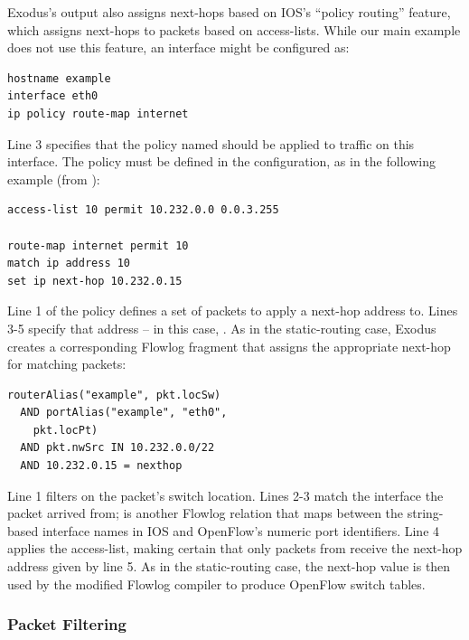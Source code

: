 Exodus's output also assigns next-hops based on IOS's ``policy
routing'' feature, which assigns next-hops to packets
based on access-lists. While our main example does not
use this feature, an interface might be configured as:

\begin{lstlisting}[label=lst:policy-route-decl,language=IOS]
hostname example
interface eth0
ip policy route-map internet
\end{lstlisting}

\noindent Line 3 specifies that the policy named  should
be applied to traffic on this interface. The  policy
must be defined in the configuration, as in the following example
(from \cite{n++:lisa-margrave-firewalls}):
\begin{lstlisting}[label=lst:policy-route,language=IOS]
access-list 10 permit 10.232.0.0 0.0.3.255

route-map internet permit 10
match ip address 10
set ip next-hop 10.232.0.15
\end{lstlisting}

\noindent
Line 1 of the policy defines a set of packets to apply a next-hop
address to. Lines 3-5 specify that address -- in this case,
.  As in the static-routing case, Exodus creates a
corresponding Flowlog fragment that assigns the appropriate next-hop
for matching packets:
\begin{lstlisting}[label=lst:policy-routing-flowlog,language=Flowlog]
routerAlias("example", pkt.locSw)
  AND portAlias("example", "eth0",
    pkt.locPt) 
  AND pkt.nwSrc IN 10.232.0.0/22
  AND 10.232.0.15 = nexthop
\end{lstlisting}

\noindent Line 1 filters on the packet's switch location. Lines 2-3
match the interface the packet arrived from;
 is another Flowlog relation that maps between the
string-based interface names in IOS and OpenFlow's numeric port
identifiers. Line 4 applies the access-list, making certain that only
packets from  receive the next-hop address given
by line 5. As in the static-routing case, the next-hop value is then
used by the modified Flowlog compiler to produce OpenFlow switch
tables.

\subsubsection{Packet Filtering}
\label{sec:filtering}

